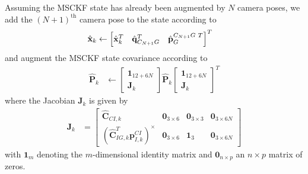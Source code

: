 \documentclass[letterpaper, 10 pt, conference]{ieeeconf}  %
\def\Vec#1{\mathbf{#1}}
\newcommand{\bbm}{\begin{bmatrix}}
\newcommand{\ebm}{\end{bmatrix}}
\begin{document}
Assuming the MSCKF state has already been augmented by $N$ camera poses, we add the $\left(N+1\right)^\text{th}$ camera pose to the state according to
\begin{align}
    \hat{\Vec{x}}_k &\leftarrow \bbm \hat{\Vec{x}}_k^T & \hat{\Vec{q}}_{C_{N+1} G}^T & \hat{\Vec{p}}_G^{C_{N+1} G \hspace{0.3em} T} \ebm^T 
\end{align}
and augment the MSCKF state covariance according to
\begin{align}
    \hat{\Vec{P}}_k &\leftarrow \bbm \Vec{1}_{12+6N} \\ \Vec{J}_k \ebm \hat{\Vec{P}}_k \bbm \Vec{1}_{12+6N} \\ \Vec{J}_k \ebm^T
\end{align}
where the Jacobian $\Vec{J}_k$ is given by
\begin{align}
\Vec{J}_k &= \bbm \hat{\Vec{C}}_{C I, k} & \Vec{0}_{3\times6} & \Vec{0}_{3\times3} & \Vec{0}_{3\times6N} \\
                            \left(\hat{\Vec{C}}_{I G, k}^T \Vec{p}_{I,k}^{CI}\right)^\times & \Vec{0}_{3\times6} & \Vec{1}_3 & \Vec{0}_{3\times6N}
                \ebm
\end{align}
with $\Vec 1_m$ denoting the $m$-dimensional identity matrix and $\Vec 0_{n\times p}$ an $n\times p$ matrix of zeros.
\end{document}
